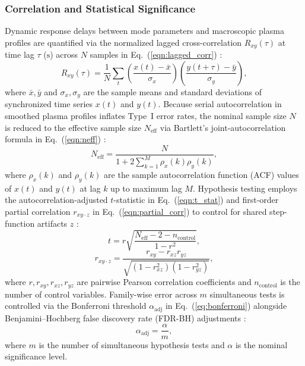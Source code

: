 \subsubsection{Correlation and Statistical Significance}
Dynamic response delays between mode parameters and macroscopic plasma profiles are quantified via the normalized lagged cross-correlation $R_{xy}(\tau)$ at time lag $\tau$ ($\mathrm{s}$) across $N$ samples in Eq.~(\ref{eqn:lagged_corr}) \cite{bendat2010random, Zhong2024}:
\begin{equation}
\label{eqn:lagged_corr}
R_{xy}(\tau) = \frac{1}{N} \sum_{t} \left(\frac{x(t) - \bar{x}}{\sigma_x}\right)\left(\frac{y(t+\tau) - \bar{y}}{\sigma_y}\right),
\end{equation}
\noindent where $\bar{x}, \bar{y}$ and $\sigma_x, \sigma_y$ are the sample means and standard deviations of synchronized time series $x(t)$ and $y(t)$. Because serial autocorrelation in smoothed plasma profiles inflates Type~I error rates, the nominal sample size $N$ is reduced to the effective sample size $N_{\mathrm{eff}}$ via Bartlett's joint-autocorrelation formula in Eq.~(\ref{eqn:neff}) \cite{Afyouni2019, shumway2017time}:
\begin{equation}
\label{eqn:neff}
N_{\mathrm{eff}} = \frac{N}{1 + 2 \sum_{k=1}^{M} \rho_x(k)\rho_y(k)},
\end{equation}
\noindent where $\rho_x(k)$ and $\rho_y(k)$ are the sample autocorrelation function (ACF) values of $x(t)$ and $y(t)$ at lag $k$ up to maximum lag $M$. Hypothesis testing employs the autocorrelation-adjusted $t$-statistic in Eq.~(\ref{eqn:t_stat}) \cite{shumway2017time} and first-order partial correlation $r_{xy \cdot z}$ in Eq.~(\ref{eqn:partial_corr}) to control for shared step-function artifacts $z$ \cite{james2021statistical}:
\begin{equation}
\label{eqn:t_stat}
t = r \sqrt{\frac{N_{\mathrm{eff}} - 2 - n_{\mathrm{control}}}{1 - r^2}},
\end{equation}
\begin{equation}
\label{eqn:partial_corr}
r_{xy \cdot z} = \frac{r_{xy} - r_{xz}r_{yz}}{\sqrt{(1 - r_{xz}^2)(1 - r_{yz}^2)}},
\end{equation}
\noindent where $r, r_{xy}, r_{xz}, r_{yz}$ are pairwise Pearson correlation coefficients and $n_{\mathrm{control}}$ is the number of control variables. Family-wise error across $m$ simultaneous tests is controlled via the Bonferroni threshold $\alpha_{\mathrm{adj}}$ in Eq.~(\ref{eq:bonferroni}) \cite{dunn1961multiple} alongside Benjamini--Hochberg false discovery rate (FDR-BH) adjustments \cite{Benjamini1995}:
\begin{equation}
\label{eq:bonferroni}
\alpha_{\mathrm{adj}} = \frac{\alpha}{m},
\end{equation}
\noindent where $m$ is the number of simultaneous hypothesis tests and $\alpha$ is the nominal significance level.

